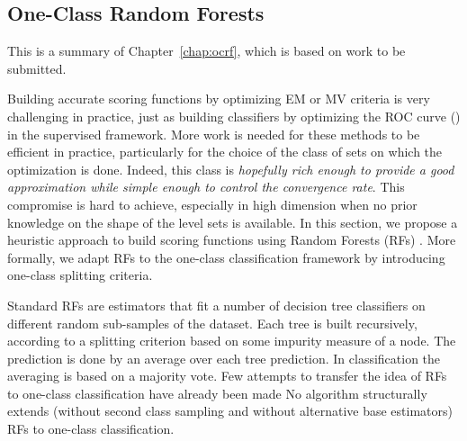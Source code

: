 \subsection{One-Class Random Forests}
\label{resume:ocrf}
This is a summary of Chapter~\ref{chap:ocrf}, which is based on work \citep{OCRF16} to be submitted.


Building accurate scoring functions by optimizing EM or MV criteria is very challenging in practice, just as building classifiers by optimizing the ROC curve (\cite{Clemencon2010}) in the supervised framework.
%
More work is needed for these methods to be efficient in practice, particularly for the choice of the class of sets on which the optimization is done.
%
Indeed, %
this class is \emph{hopefully rich enough to provide a good approximation while simple enough to control the convergence rate}. This compromise is hard to achieve, especially in high dimension when no prior knowledge on the shape of the level sets is available. 
%
%
In this section, we propose a heuristic approach to build scoring functions using Random Forests (RFs) \citep{Breiman2001, Genuer2008, Biau2008, Biau2016}. %
More formally, we adapt RFs to the one-class classification framework by introducing one-class splitting criteria.

Standard RFs are estimators that fit a number of decision tree
classifiers on different random sub-samples of the dataset.
Each tree is built recursively, according to a splitting criterion based on
some impurity measure of a node. The prediction is done by an average over each tree prediction. In classification the averaging is based on a majority vote.
Few attempts to transfer the idea of RFs to one-class
classification have already been made \citep{Desir12, Liu2008, Shi2012}
%
No algorithm structurally extends (without second class sampling and without alternative base estimators) RFs to one-class classification.

